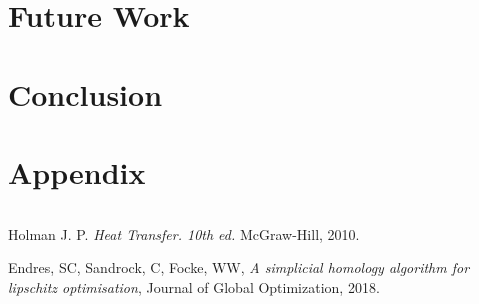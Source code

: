 \documentclass{article}
\begin{document}
\section{Future Work}


\section{Conclusion}



\section{Appendix}

\begin {lstlisting}[language=Python]

\end{lstlisting}



\begin{thebibliography}{9}

    Holman J. P.
    \emph{Heat Transfer. 10th ed.}
    McGraw-Hill,
    2010.


  Endres, SC, Sandrock, C, Focke, WW,
  \emph{A simplicial homology algorithm for lipschitz optimisation},
  Journal of Global Optimization,
  2018.

\end{thebibliography}
\end{document}
